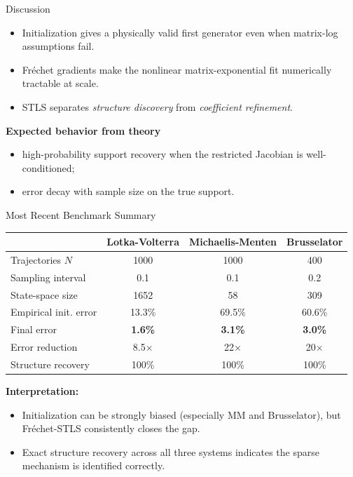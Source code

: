 \documentclass[10pt,aspectratio=169]{beamer}
\begin{document}
\begin{frame}{ Discussion}
\begin{itemize}
    \item Initialization gives a physically valid first generator even when matrix-log assumptions fail.
    \item Fr\'{e}chet gradients make the nonlinear matrix-exponential fit numerically tractable at scale.
    \item STLS separates \textit{structure discovery} from \textit{coefficient refinement}.
\end{itemize}

\vspace{0.4em}
\textbf{Expected behavior from theory}
\begin{itemize}
    \item high-probability support recovery when the restricted Jacobian is well-conditioned;
    \item error decay with sample size on the true support.
\end{itemize}
\end{frame}

\begin{frame}{Most Recent Benchmark Summary}
\begin{center}
\begin{tabular}{lccc}
\toprule
& \textbf{Lotka-Volterra} & \textbf{Michaelis-Menten} & \textbf{Brusselator} \\
\midrule
Trajectories $N$ & 1000 & 1000 & 400 \\
Sampling interval & 0.1 & 0.1 & 0.2 \\
State-space size & 1652 & 58 & 309 \\
\midrule
Empirical init. error & 13.3\% & 69.5\% & 60.6\% \\
\rowcolor[gray]{0.9} Final error & \textbf{1.6\%} & \textbf{3.1\%} & \textbf{3.0\%} \\
\rowcolor[gray]{0.9} Error reduction & 8.5$\times$ & 22$\times$ & 20$\times$ \\
Structure recovery & 100\% & 100\% & 100\% \\
\bottomrule
\end{tabular}
\end{center}

\vspace{0.3em}
\textbf{Interpretation:}
\begin{itemize}
    \item Initialization can be strongly biased (especially MM and Brusselator), but Fr\'{e}chet-STLS consistently closes the gap.
    \item Exact structure recovery across all three systems indicates the sparse mechanism is identified correctly.
\end{itemize}
\end{frame}
\end{document}
